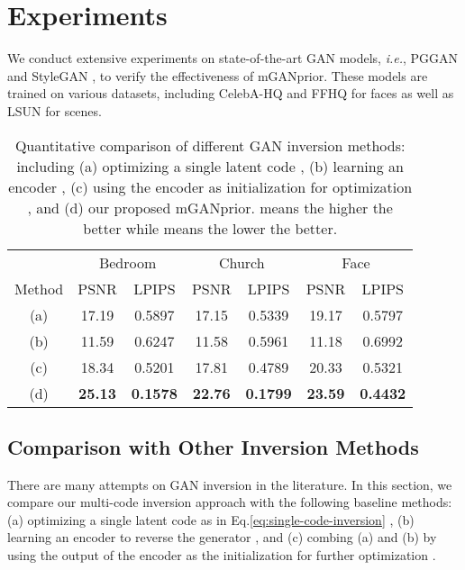 \documentclass[10pt,twocolumn,letterpaper]{article}
\begin{document}
\vspace{-6pt}\section{Experiments}\label{sec:experiments}
We conduct extensive experiments on state-of-the-art GAN models, \emph{i.e.}, PGGAN \cite{pggan} and StyleGAN \cite{stylegan}, to verify the effectiveness of mGANprior.
These models are trained on various datasets, including CelebA-HQ \cite{pggan} and FFHQ \cite{stylegan} for faces as well as LSUN \cite{lsun} for scenes.


\setlength{\tabcolsep}{4pt}
\begin{table}[t]
  \centering
  \footnotesize
  \captionsetup{font=small}
  \caption{
    Quantitative comparison of different GAN inversion methods: including (a) optimizing a single latent code \cite{invertibility}, (b) learning an encoder \cite{zhu2016generative}, (c) using the encoder as initialization for optimization \cite{inverting2019}, and (d) our proposed mGANprior.
 means the higher the better while  means the lower the better.
  }
  \label{tab:inversion}
  \vspace{-8pt}
  \begin{tabular}{ccccccc}
    \hline
            & \multicolumn{2}{c}{Bedroom} & \multicolumn{2}{c}{Church} & \multicolumn{2}{c}{Face} \\
    \cmidrule(lr){2-3} \cmidrule(lr){4-5} \cmidrule(lr){6-7}
    Method  & PSNR & LPIPS & PSNR & LPIPS & PSNR & LPIPS \\
    \hline
    (a)
    & 17.19 & 0.5897 & 17.15 & 0.5339 & 19.17 & 0.5797 \\
    (b)
    & 11.59 & 0.6247 & 11.58 & 0.5961 &  11.18 & 0.6992 \\
    (c)
    & 18.34 & 0.5201 & 17.81 & 0.4789 &  20.33 & 0.5321 \\
    (d)
    & \bf 25.13 & \bf 0.1578 & \bf 22.76 & \bf 0.1799 & \bf 23.59 & \bf 0.4432 \\
    \hline
  \end{tabular}
  \vspace{-10pt}
\end{table}


\subsection{Comparison with Other Inversion Methods}\label{subsec:inversion-comparison}
There are many attempts on GAN inversion in the literature.
In this section, we compare our multi-code inversion approach with the following baseline methods:
(a) optimizing a single latent code  as in Eq.\eqref{eq:single-code-inversion} \cite{invertibility},
(b) learning an encoder to reverse the generator \cite{zhu2016generative},
and (c) combing (a) and (b) by using the output of the encoder as the initialization for further optimization \cite{inverting2019}.
\end{document}
